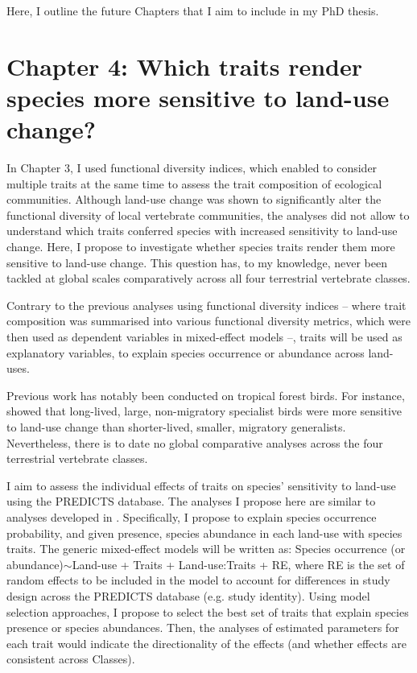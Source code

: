 Here, I outline the future Chapters that I aim to include in my PhD thesis.

\section{Chapter 4: Which traits render species more sensitive to land-use change? }
In Chapter 3, I used functional diversity indices, which enabled to consider multiple traits at the same time to assess the trait composition of ecological communities. Although land-use change was shown to significantly alter the functional diversity of local vertebrate communities, the analyses did not allow to understand which traits conferred species with increased sensitivity to land-use change. Here, I propose to investigate whether species traits render them more sensitive to land-use change. This question has, to my knowledge, never been tackled at global scales comparatively across all four terrestrial vertebrate classes.

Contrary to the previous analyses using functional diversity indices -- where trait composition was summarised into various functional diversity metrics, which were then used as dependent variables in mixed-effect models --, traits will be used as explanatory variables, to explain species occurrence or abundance across land-uses.

Previous work has notably been conducted on tropical forest birds. For instance, \citet{Newbold2013} showed that long-lived, large, non-migratory specialist birds were more sensitive to land-use change than shorter-lived, smaller, migratory generalists. Nevertheless, there is to date no global comparative analyses across the four terrestrial vertebrate classes.

I aim to assess the individual effects of traits on species' sensitivity to land-use using the PREDICTS database. The analyses I propose here are similar to analyses developed in \citet{Newbold2013}. Specifically, I propose to explain species occurrence probability, and given presence, species abundance in each land-use with species traits. The generic mixed-effect models will be written as:  Species occurrence (or abundance)$\sim$Land-use + Traits + Land-use:Traits + RE, where RE is the set of random effects to be included in the model to account for differences in study design across the PREDICTS database (e.g. study identity). Using model selection approaches, I propose to select the best set of traits that explain species presence or species abundances. Then, the analyses of estimated parameters for each trait would indicate the directionality of the effects (and whether effects are consistent across Classes).

